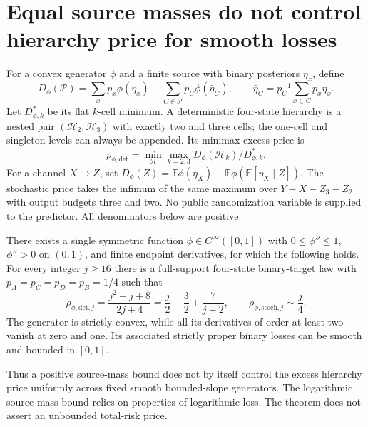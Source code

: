 \section{Equal source masses do not control hierarchy price for smooth losses}
\label{sec:equal-mass-generator}

For a convex generator $\phi$ and a finite source with binary posteriors
$\eta_x$, define
\[
 D_\phi(\mathcal P)=\sum_xp_x\phi(\eta_x)
  -\sum_{C\in\mathcal P}p_C\phi(\bar\eta_C),\qquad
 \bar\eta_C=p_C^{-1}\sum_{x\in C}p_x\eta_x.
\]
Let $D_{\phi,k}^*$ be its flat $k$-cell minimum.  A deterministic
four-state hierarchy is a nested pair $(\mathcal H_2,\mathcal H_3)$
with exactly two and three cells; the one-cell and singleton levels can
always be appended.  Its minimax excess price is
\[
 \rho_{\phi,\mathrm{det}}
 =\min_{\mathcal H}\max_{k=2,3}
     D_\phi(\mathcal H_k)/D_{\phi,k}^*.
\]
For a channel $X\to Z$, set
$D_\phi(Z)=\mathbb E\phi(\eta_X)
 -\mathbb E\phi(\mathbb E[\eta_X\mid Z])$.
The stochastic price takes the infimum of the same maximum over
$Y-X-Z_3-Z_2$ with output budgets three and two.  No public randomization
variable is supplied to the predictor.  All denominators below are positive.

\begin{theorem}
\label{thm:equal-mass-smooth}
There exists a single symmetric function $\phi\in C^\infty([0,1])$
with $0\leq\phi''\leq1$, $\phi''>0$ on $(0,1)$, and finite endpoint
derivatives, for which the following holds.  For every integer $j\geq16$
there is a full-support four-state binary-target law with
$p_A=p_C=p_D=p_B=1/4$ such that
\[
 \rho_{\phi,\mathrm{det},j}
   =\frac{j^2-j+8}{2j+4}
   =\frac j2-\frac32+\frac7{j+2},\qquad
 \rho_{\phi,\mathrm{stoch},j}\sim\frac j4.
 \tag{F1}\label{eq:equal-mass-prices}
\]
The generator is strictly convex, while all its derivatives of order at
least two vanish at zero and one.  Its associated strictly proper binary
losses can be smooth and bounded in $[0,1]$.
\end{theorem}

Thus a positive source-mass bound does not by itself control the excess
hierarchy price uniformly across fixed smooth bounded-slope generators.
The logarithmic source-mass bound relies on properties of logarithmic
loss.  The theorem does not assert an unbounded total-risk price.

